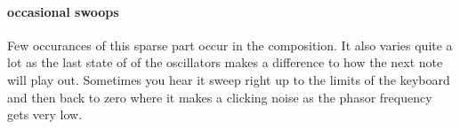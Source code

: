 \paragraph{occasional swoops}
Few occurances of this sparse part occur in the composition.
It also varies quite a lot as the last state of
of the oscillators makes a difference to how the next note will
play out. Sometimes you hear it sweep right up to the limits of
the keyboard and then back to zero where it makes a clicking noise
as the phasor frequency gets very low. 